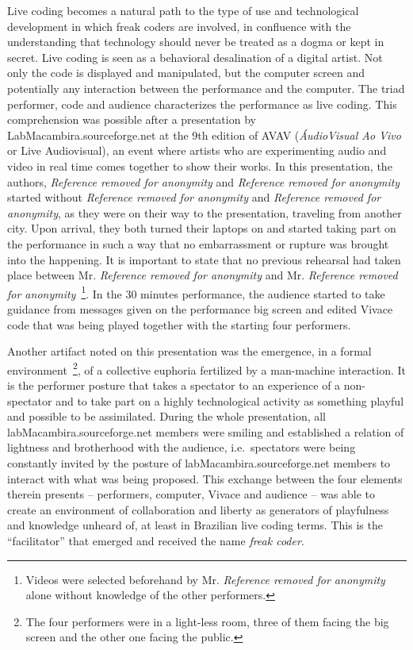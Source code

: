 \documentclass[letterpaper, 12pt]{article}
\begin{document}
Live coding becomes a natural path to the type of use and
technological development in which freak coders are involved, in
confluence with the understanding that technology should never be
treated as a dogma or kept in secret. Live coding is seen as a
behavioral desalination of a digital artist. Not only the code is
displayed and manipulated, but the computer screen and potentially any
interaction between the performance and the computer. The triad
performer, code and audience characterizes the performance as live
coding.  This comprehension was possible after a presentation by
LabMacambira.sourceforge.net at the 9th edition of AVAV
(\textit{\'{A}udioVisual Ao Vivo} or Live Audiovisual), an event where
artists who are experimenting audio and video in real time comes
together to show their works. In this presentation, the authors, \textit{Reference removed for anonymity} and \textit{Reference removed for anonymity} started without \textit{Reference removed for anonymity} and \textit{Reference removed for anonymity}, as they were on their way to the presentation, traveling from
another city. Upon arrival, they both turned their laptops on and
started taking part on the performance in such a way that no
embarrassment or rupture was brought into the happening.  It is
important to state that no previous rehearsal had taken place between
Mr. \textit{Reference removed for anonymity} and Mr. \textit{Reference removed for anonymity}~\footnote{Videos were selected beforehand
  by Mr. \textit{Reference removed for anonymity} alone without knowledge of the other
  performers.}. In the 30 minutes performance, the audience started to
take guidance from messages given on the performance big screen and
edited Vivace code that was being played together with the starting
four performers.

Another artifact noted on this presentation was the emergence, in a
formal environment~\footnote{The four performers were in a light-less
  room, three of them facing the big screen and the other one facing
  the public.}, of a collective euphoria fertilized by a man-machine
interaction. It is the performer posture that takes a spectator to an
experience of a non-spectator and to take part on a highly
technological activity as something playful and possible to be
assimilated.  During the whole presentation, all
labMacambira.sourceforge.net members were smiling and established a
relation of lightness and brotherhood with the audience,
i.e.\ spectators were being constantly invited by the posture of
labMacambira.sourceforge.net members to interact with what was being
proposed.  This exchange between the four elements therein presents --
performers, computer, Vivace and audience -- was able to create an
environment of collaboration and liberty as generators of playfulness
and knowledge unheard of, at least in Brazilian live coding
terms. This is the ``facilitator'' that emerged and received the name
\emph{freak coder}.
\end{document}
